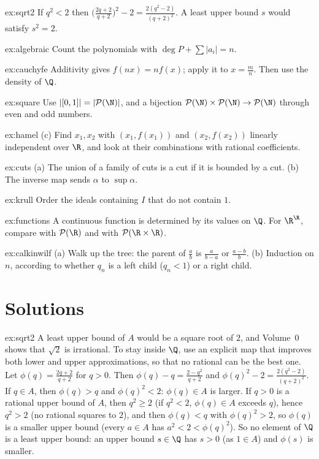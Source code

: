 \begin{hint}{ex:sqrt2}
If $q^2<2$ then $\bigl(\frac{2q+2}{q+2}\bigr)^2-2=\frac{2(q^2-2)}{(q+2)^2}$. A least upper bound $s$ would satisfy $s^2=2$.
\end{hint}
\begin{hint}{ex:algebraic}
Count the polynomials with $\deg P+\sum|a_i|=n$.
\end{hint}
\begin{hint}{ex:cauchyfe}
Additivity gives $f(nx)=nf(x)$; apply it to $x=\frac mn$. Then use the density of $\Q$.
\end{hint}
\begin{hint}{ex:square}
Use $|[0,1]|=|\mathcal P(\N)|$, and a bijection $\mathcal P(\N)\times\mathcal P(\N)\to\mathcal P(\N)$ through even and odd numbers.
\end{hint}
\begin{hint}{ex:hamel}
(c) Find $x_1,x_2$ with $(x_1,f(x_1))$ and $(x_2,f(x_2))$ linearly independent over $\R$, and look at their combinations with rational coefficients.
\end{hint}
\begin{hint}{ex:cuts}
(a) The union of a family of cuts is a cut if it is bounded by a cut. (b) The inverse map sends $\alpha$ to $\sup\alpha$.
\end{hint}
\begin{hint}{ex:krull}
Order the ideals containing $I$ that do not contain $1$.
\end{hint}
\begin{hint}{ex:functions}
A continuous function is determined by its values on $\Q$. For $\R^\R$, compare with $\mathcal P(\R)$ and with $\mathcal P(\R\times\R)$.
\end{hint}
\begin{hint}{ex:calkinwilf}
(a) Walk up the tree: the parent of $\frac ab$ is $\frac a{b-a}$ or $\frac{a-b}b$. (b) Induction on $n$, according to whether $q_n$ is a left child ($q_n<1$) or a
right child.
\end{hint}

\section{Solutions}

\begin{solution}{ex:sqrt2}
\idea A least upper bound of $A$ would be a square root of $2$, and Volume~0 shows that $\sqrt2$ is irrational. To stay inside $\Q$, use an
explicit map that improves both lower and upper approximations, so that no rational can be the best one.
\writeup Let $\phi(q)=\frac{2q+2}{q+2}$ for $q>0$. Then $\phi(q)-q=\frac{2-q^2}{q+2}$ and $\phi(q)^2-2=\frac{2(q^2-2)}{(q+2)^2}$. If $q\in A$, then $\phi(q)>q$ and $\phi(q)^2<2$: $\phi(q)\in A$
is larger. If $q>0$ is a rational upper bound of $A$, then $q^2\ge2$ (if $q^2<2$, $\phi(q)\in A$ exceeds $q$), hence $q^2>2$ (no rational squares to
$2$), and then $\phi(q)<q$ with $\phi(q)^2>2$, so $\phi(q)$ is a smaller upper bound (every $a\in A$ has $a^2<2<\phi(q)^2$). So no element of $\Q$ is a
least upper bound: an upper bound $s\in\Q$ has $s>0$ (as $1\in A$) and $\phi(s)$ is smaller.
\end{solution}

